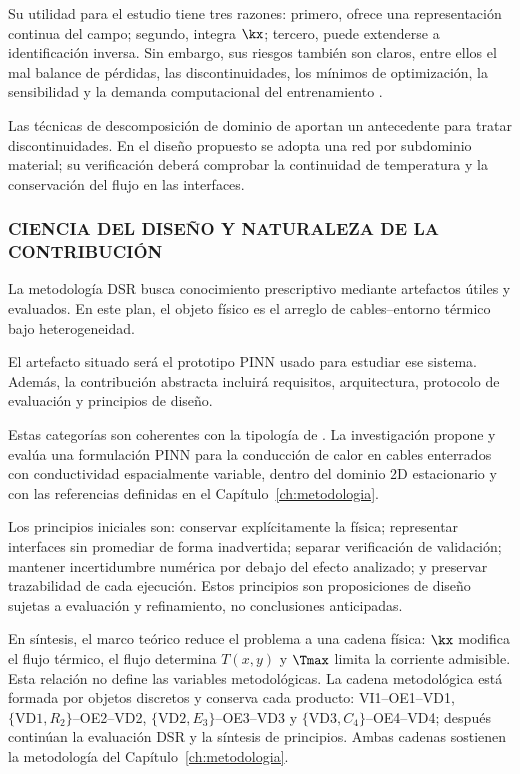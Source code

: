 Su utilidad para el estudio tiene tres razones: primero, ofrece una representación continua del campo; segundo, integra $\kx$; tercero, puede extenderse a identificación inversa. Sin embargo, sus riesgos también son claros, entre ellos el mal balance de pérdidas, las discontinuidades, los mínimos de optimización, la sensibilidad y la demanda computacional del entrenamiento \parencites[2--6]{ren2025}[16]{pan2025}.

Las técnicas de descomposición de dominio de \textcite[1--2]{shukla2021} aportan un antecedente para tratar discontinuidades. En el diseño propuesto se adopta una red por subdominio material; su verificación deberá comprobar la continuidad de temperatura y la conservación del flujo en las interfaces.

\subsubsection{CIENCIA DEL DISEÑO Y NATURALEZA DE LA CONTRIBUCIÓN}
\label{subsec:dsr-contribucion}

La metodología DSR busca conocimiento prescriptivo mediante artefactos útiles y evaluados. En este plan, el objeto físico es el arreglo de cables--entorno térmico bajo heterogeneidad.

El artefacto situado será el prototipo PINN usado para estudiar ese sistema. Además, la contribución abstracta incluirá requisitos, arquitectura, protocolo de evaluación y principios de diseño.

Estas categorías son coherentes con la tipología de \textcite[343--349]{gregor2013}. La investigación propone y evalúa una formulación PINN para la conducción de calor en cables enterrados con conductividad espacialmente variable, dentro del dominio 2D estacionario y con las referencias definidas en el Capítulo~\ref{ch:metodologia}.

Los principios iniciales son: conservar explícitamente la física; representar interfaces sin promediar de forma inadvertida; separar verificación de validación; mantener incertidumbre numérica por debajo del efecto analizado; y preservar trazabilidad de cada ejecución. Estos principios son proposiciones de diseño sujetas a evaluación y refinamiento, no conclusiones anticipadas.

En síntesis, el marco teórico reduce el problema a una cadena física: $\kx$ modifica el flujo térmico, el flujo determina $T(x,y)$ y $\Tmax$ limita la corriente admisible. Esta relación no define las variables metodológicas. La cadena metodológica está formada por objetos discretos y conserva cada producto: VI1--OE1--VD1, $\{\mathrm{VD1},R_2\}$--OE2--VD2, $\{\mathrm{VD2},E_3\}$--OE3--VD3 y $\{\mathrm{VD3},C_4\}$--OE4--VD4; después continúan la evaluación DSR y la síntesis de principios. Ambas cadenas sostienen la metodología del Capítulo~\ref{ch:metodologia}.

